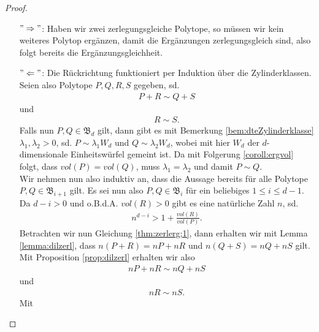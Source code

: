 \documentclass[11pt,titlepage]{article}
\theoremstyle{definition}
\theoremstyle{remark}
\begin{document}
	\begin{proof}
		\noindent
		\begin{itemize}
			\item[$"\Rightarrow"$:] Haben wir zwei zerlegungsgleiche Polytope, so müssen wir kein weiteres Polytop ergänzen, damit die Ergänzungen zerlegungsgleich sind, also folgt bereits die Ergänzungsgleichheit.
			
			\item[$"\Leftarrow"$:] Die Rückrichtung funktioniert per 
			Induktion über die Zylinderklassen. Seien also Polytope 
			$P,Q,R,S$ gegeben, sd. 
			\begin{align}
			P+R\sim Q+S \label{thm:zerlerg;1}
			\end{align}
			und
			\begin{align}
			R\sim S. \label{thm:zerlerg;2}
			\end{align}
			Falls nun $P,Q\in \mathfrak{B}_d$ gilt, dann gibt es mit Bemerkung 
			\ref{bem:dteZylinderklasse} 
			$\lambda_1,\lambda_2 >0$, sd. $P\sim \lambda_1 W_d$ und 
			$Q\sim \lambda_2 W_d$, wobei mit hier $W_d$ der $d$-dimensionale 
			Einheitswürfel gemeint ist. Da mit Folgerung \ref{coroll:ergvol} 
			folgt, dass $vol(P)=vol(Q)$, muss $\lambda_1 =\lambda_2$ und 
			damit $P\sim Q$. \\
			Wir nehmen nun also induktiv an, dass die Aussage bereits für alle 
			Polytope $P,Q\in\mathfrak{B}_{i+1}$ gilt. Es sei nun also 
			$P,Q\in\mathfrak{B}_i$ für ein beliebiges $1\leq i\leq d-1$. 
			Da $d-i>0$ und o.B.d.A. $vol(R)>0$ gibt es eine natürliche Zahl $n$, sd. 
			\begin{align}
			n^{d-i}>1+\frac{vol(R)}{vol(P)}. \label{thm:zerlerg;3}
			\end{align}
			Betrachten wir nun Gleichung \ref{thm:zerlerg;1}, dann erhalten wir 
			mit Lemma \ref{lemma:dilzerl}, dass $n(P+R)=nP+nR$ und $n(Q+S)=nQ+nS$ 
			gilt. Mit Proposition \ref{prop:dilzerl} erhalten wir also
			\begin{align}
			nP+nR\sim nQ+nS \label{thm:zerlerg;4}
			\end{align}
			und
			\begin{align}
			nR\sim nS. \label{thm:zerlerg;5}
			\end{align}
			Mit 
			
			

\end{itemize}
\end{proof}
\end{document}
